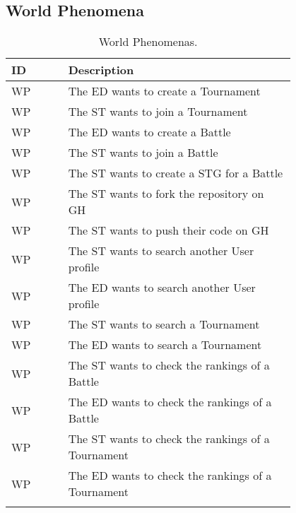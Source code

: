 \subsection{World Phenomena}
\label{subsec:world_phenomena}%
\setcounter{wp}{1}
\newcommand{\cwp}{\thewp\stepcounter{wp}}
\begin{center}
    \begin{longtable}{ |l|p{0.8\linewidth}| }
        \hline
        \textbf{ID} & \textbf{Description}                                                \\
        \hline
        WP\cwp      & The ED wants to create a Tournament                           \\
        \hline
        WP\cwp      & The ST wants to join a Tournament   \\
        \hline
        WP\cwp      & The ED wants to create a Battle   \\
        \hline
        WP\cwp      & The ST wants to join a Battle   \\
        \hline
        WP\cwp      & The ST wants to create a STG for a Battle   \\
        \hline
        WP\cwp      & The ST wants to fork the repository on GH   \\
        \hline
        WP\cwp      & The ST wants to push their code on GH   \\
        \hline
        WP\cwp      & The ST wants to search another User profile   \\
        \hline
        WP\cwp      & The ED wants to search another User profile   \\
        \hline
        WP\cwp      & The ST wants to search a Tournament   \\
        \hline
        WP\cwp      & The ED wants to search a Tournament  \\
        \hline
        WP\cwp      & The ST wants to check the rankings of a Battle \\
        \hline
        WP\cwp      & The ED wants to check the rankings of a Battle \\
        \hline
        WP\cwp      & The ST wants to check the rankings of a Tournament \\
        \hline
        WP\cwp      & The ED wants to check the rankings of a Tournament \\
        \hline
        \caption{World Phenomenas.}
        \label{tab:worldph_tab}%
    \end{longtable}
\end{center}

